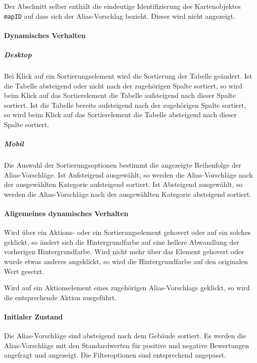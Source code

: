 Der Abschnitt selber enthält die eindeutige Identifizierung des Kartenobjektes \verb#mapID# auf dass sich der Alias-Vorschlag bezieht. Dieser wird nicht angezeigt.

\paragraph*{Dynamisches Verhalten}
\subparagraph*{Desktop}
Bei Klick auf ein Sortierungselement wird die Sortierung der Tabelle geändert.
Ist die Tabelle absteigend oder nicht nach der zugehörigen Spalte sortiert, so wird beim Klick auf das Sortierelement die Tabelle aufsteigend nach dieser Spalte sortiert.
Ist die Tabelle bereits aufsteigend nach der zugehörigen Spalte sortiert, so wird beim Klick auf das Sortierelement die Tabelle absteigend nach dieser Spalte sortiert.

\subparagraph*{Mobil}
Die Auswahl der Sortierungsoptionen bestimmt die angezeigte Reihenfolge der Alias-Vorschläge.
Ist \dq Aufsteigend \dq{} ausgewählt, so werden die Alias-Vorschläge nach der ausgewählten Kategorie aufsteigend sortiert.
Ist \dq Absteigend \dq{} ausgewählt, so werden die Alias-Vorschläge nach der ausgewählten Kategorie absteigend sortiert.

\paragraph*{Allgemeines dynamisches Verhalten}
Wird über ein Aktions- oder ein Sortierungselement gehovert oder auf ein solches geklickt, so ändert sich die Hintergrundfarbe auf eine hellere Abwandlung der vorherigen Hintergrundfarbe.
Wird nicht mehr über das Element gehovert oder wurde etwas anderes angeklickt, so wird die Hintergrundfarbe auf den originalen Wert gesetzt.

Wird auf ein Aktionselement eines zugehörigen Alias-Vorschlags geklickt, so wird die entsprechende Aktion ausgeführt.

\paragraph*{Initialer Zustand}
Die Alias-Vorschläge sind absteigend nach dem Gebäude sortiert.
Es werden die Alias-Vorschläge mit den Standardwerten für positive und negative Bewertungen angefragt und angezeigt.
Die Filteroptionen sind entsprechend angepasst.